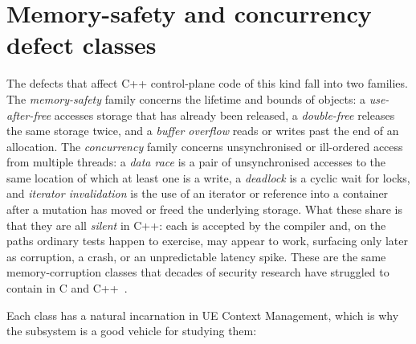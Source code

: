 \documentclass[english,oneside,a4paper,censored,csm,software-track-2020]{HYthesisML}
\begin{document}
\section{Memory-safety and concurrency defect classes}
The defects that affect C++ control-plane code of this kind fall into two families. The
\emph{memory-safety} family concerns the lifetime and bounds of objects: a \emph{use-after-free}
accesses storage that has already been released, a \emph{double-free} releases the same storage
twice, and a \emph{buffer overflow} reads or writes past the end of an allocation. The
\emph{concurrency} family concerns unsynchronised or ill-ordered access from multiple threads: a
\emph{data race} is a pair of unsynchronised accesses to the same location of which at least one
is a write, a \emph{deadlock} is a cyclic wait for locks, and \emph{iterator invalidation} is
the use of an iterator or reference into a container after a mutation has moved or freed the
underlying storage. What these share is that they are all \emph{silent} in C++: each is accepted
by the compiler and, on the paths ordinary tests happen to exercise, may appear to work,
surfacing only later as corruption, a crash, or an unpredictable latency spike. These are the
same memory-corruption classes that decades of security research have struggled to contain in C
and C++~\cite{szekeres2013sok}.

Each class has a natural incarnation in UE Context Management, which is why the subsystem is a
good vehicle for studying them:
\end{document}
